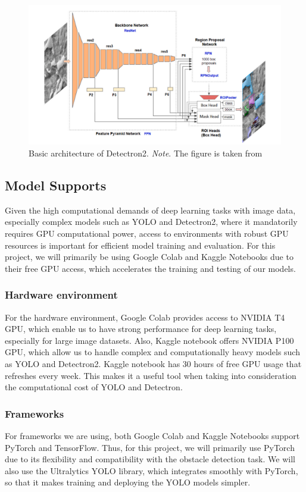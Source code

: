 \documentclass[stu,12pt,floatsintext]{apa7}
\begin{document}
 \begin{figure}[!htb]
     \centering
     \includegraphics[width=0.75\linewidth]{images/Detectron2_architecture.png}
     \caption{Basic architecture of Detectron2. \textit{Note}. The figure is taken from \textcite{Marc2022Detectron2}}
     \label{fig:Detectron2-architecture}
 \end{figure}


\subsection{Model Supports}
Given the high computational demands of deep learning tasks with image data, especially complex models such as YOLO and Detectron2, where it mandatorily requires GPU computational power, access to environments with robust GPU resources is important for efficient model training and evaluation. For this project, we will primarily be using Google Colab and Kaggle Notebooks due to their free GPU access, which accelerates the training and testing of our models. 


\subsubsection{Hardware environment}
For the hardware environment, Google Colab provides access to NVIDIA T4 GPU, which enable us to have strong performance for deep learning tasks, especially for large image datasets. Also, Kaggle notebook offers NVIDIA P100 GPU, which allow us to handle complex and computationally heavy models such as YOLO and Detectron2. Kaggle notebook has 30 hours of free GPU usage that refreshes every week. This makes it a useful tool when taking into consideration the computational cost of YOLO and Detectron. 

\subsubsection{Frameworks}
For frameworks we are using, both Google Colab and Kaggle Notebooks support PyTorch and TensorFlow. Thus, for this project, we will primarily use PyTorch due to its flexibility and compatibility with the obstacle detection task. We will also use the Ultralytics YOLO library, which integrates smoothly with PyTorch, so that it makes training and deploying the YOLO models simpler. 
\end{document}
